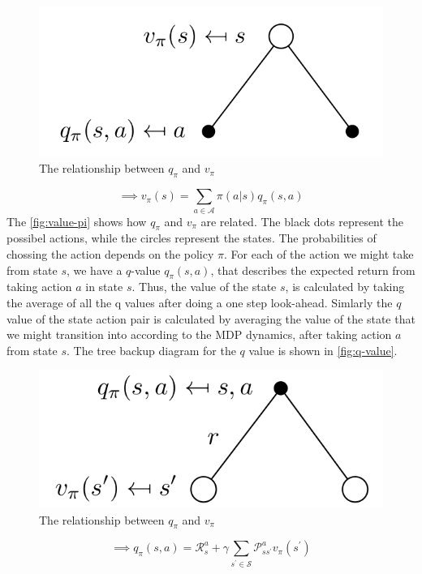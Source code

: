 \begin{figure}[H]
    \centering
    \includegraphics[width=0.5\linewidth]{figures/value-pi.png}
    \caption{The relationship between \(q_\pi\) and \(v_\pi\)}
    \label{fig:value-pi}
\end{figure}
\[
    \implies v_\pi (s) = \sum_{a \in \mathcal{A} } \pi (a|s) q_\pi (s, a)
\]
The \autoref{fig:value-pi} shows how \(q_\pi\) and \(v_\pi\) are related. The 
black dots represent the possibel actions, while the circles represent the states. The 
probabilities of chossing the action depends on the policy \(\pi \). For each of 
the action we might take from state \(s\), we have a \(q\)-value \(q_\pi (s, a)\), that describes
the expected return from taking action \(a\) in state \(s\). Thus, the value of the state \(s\), is calculated by taking the average of all the q values
after doing a one step look-ahead.
Simlarly the \(q\) value of the state action pair is calculated by averaging the value of the
state that we might transition into according to the MDP dynamics, after taking action \(a\) 
from state \(s\). The tree backup diagram for the \(q\) value is shown in \autoref{fig:q-value}.
\begin{figure}[H]
    \centering
    \includegraphics[width=0.5\linewidth]{figures/action-pi.png}
    \caption{The relationship between \(q_\pi\) and \(v_\pi\)}
    \label{fig:q-value}
\end{figure}
\[
    \implies q_\pi (s, a) = \mathcal{R} _{s}^{a} + \gamma \sum_{s^{\prime} \in \mathcal{S} } \mathcal{P} _{ss^{\prime}}^{a} v_\pi (s^{\prime} )
\]

